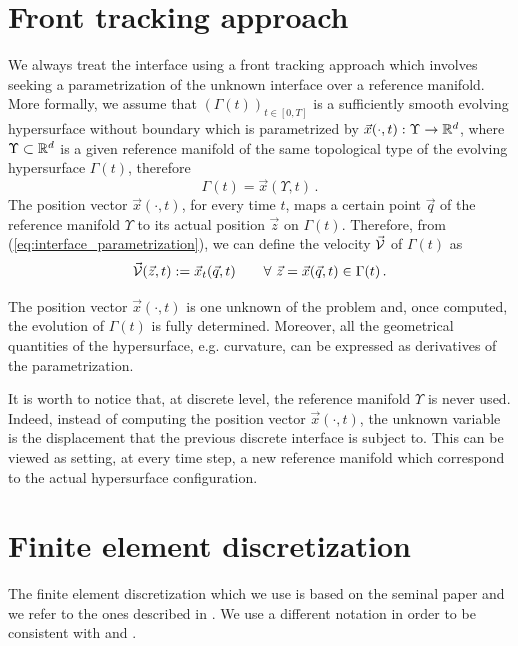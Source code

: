 \section{Front tracking approach}\label{sec:front_tracking_approach}
We always treat the interface using a front tracking approach which involves
seeking a parametrization of the unknown interface over a reference manifold.
More formally, we assume that $(\Gamma(t))_{t\in [0,T]}$ is a sufficiently
smooth evolving hypersurface without boundary which is parametrized by
$\vec x(\cdot,t):\Upsilon\to{\mathbb R}^d$, where $\Upsilon\subset {\mathbb R}^d$ is a given
reference manifold of the same topological type of the evolving hypersurface
$\Gamma(t)$, therefore
\begin{equation}\label{eq:interface_parametrization}
\Gamma(t) = \vec x(\Upsilon,t)\,.
\end{equation}
The position vector $\vec x(\cdot,t)$, for every time $t$, maps a certain point
$\vec{q}$ of the reference manifold $\Upsilon$ to its actual position
$\vec{z}$ on $\Gamma(t)$. Therefore, from (\ref{eq:interface_parametrization}),
we can define the velocity $\vec{\mathcal{V}}$ of $\Gamma(t)$ as
\begin{equation} \label{eq:V}
\vec{\mathcal{V}}(\vec z, t) := \vec x_t(\vec q, t) \qquad
\forall\ \vec z = \vec x(\vec q,t) \in \Gamma(t)\,.
\end{equation}

The position vector $\vec x(\cdot,t)$ is one unknown of the problem and, once
computed, the evolution of $\Gamma(t)$ is fully determined. Moreover, all the
geometrical quantities of the hypersurface, e.g. curvature, can be expressed as
derivatives of the parametrization.

It is worth to notice that, at discrete level, the reference manifold
$\Upsilon$ is never used. Indeed, instead of computing the position vector
$\vec x(\cdot,t)$, the unknown variable is the displacement that the previous
discrete interface is subject to. This can be viewed as setting, at every time
step, a new reference manifold which correspond to the actual hypersurface
configuration.

\section{Finite element discretization}\label{sec:geometric_pdes_fem}
The finite element discretization which we use is based on the seminal paper
\cite{Dziuk91} and we refer to the ones described in
\cite{triplej,triplejMC,gflows3d}. We use a different notation in order to be
consistent with \cite{spurious} and \cite{stokesfitted}.

